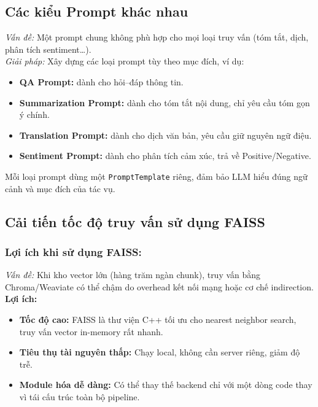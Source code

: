 \documentclass[11pt]{article}
\begin{document}
\subsection{Các kiểu Prompt khác nhau}

\textit{Vấn đề:} Một prompt chung không phù hợp cho mọi loại truy vấn (tóm tắt, dịch, phân tích sentiment…).\\

\noindent \textit{Giải pháp:} Xây dựng các loại prompt tùy theo mục đích, ví dụ:
\begin{itemize}
    \item \textbf{QA Prompt:} dành cho hỏi–đáp thông tin.
    \item \textbf{Summarization Prompt:} dành cho tóm tắt nội dung, chỉ yêu cầu tóm gọn ý chính.
    \item \textbf{Translation Prompt:} dành cho dịch văn bản, yêu cầu giữ nguyên ngữ điệu.
    \item \textbf{Sentiment Prompt:} dành cho phân tích cảm xúc, trả về Positive/Negative.
\end{itemize}

\noindent
Mỗi loại prompt dùng một \texttt{PromptTemplate} riêng, đảm bảo LLM hiểu đúng ngữ cảnh và mục đích của tác vụ.

\subsection{Cải tiến tốc độ truy vấn sử dụng FAISS}

\subsubsection*{Lợi ích khi sử dụng FAISS:}

\noindent\textit{Vấn đề:} Khi kho vector lớn (hàng trăm ngàn chunk), truy vấn bằng Chroma/Weaviate có thể chậm do overhead kết nối mạng hoặc cơ chế indirection.\\

\textbf{Lợi ích:}
\begin{itemize}
    \item \textbf{Tốc độ cao:} FAISS là thư viện C++ tối ưu cho nearest neighbor search, truy vấn vector in-memory rất nhanh.
    \item \textbf{Tiêu thụ tài nguyên thấp:} Chạy local, không cần server riêng, giảm độ trễ.
    \item \textbf{Module hóa dễ dàng:} Có thể thay thế backend chỉ với một dòng code thay vì tái cấu trúc toàn bộ pipeline.
\end{itemize}
\end{document}
